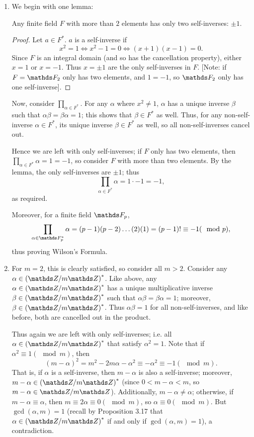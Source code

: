 \documentclass{homework}
\begin{document}
\begin{solution}
  \begin{enumerate}[label=(\alph*)]
    \item We begin with one lemma:
      \begin{lemma}
        Any finite field $F$ with more than $2$ elements has only two self-inverses: $\pm 1$.
      \end{lemma}
      \begin{proof}[Proof]
        Let $a\in F^*$. $a$ is a self-inverse if \[
          x^2=1\iff x^2-1=0\iff (x+1)(x-1)=0
        .\] Since $F$ is an integral domain (and so has the cancellation property), either $x=1$ or
        $x=-1$. Thus $x=\pm 1$ are the only self-inverses in $F$. [Note: if $F=\F_2$ only has two
        elements, and $1=-1$, so $\F_2$ only has one self-inverse].
      \end{proof}
      
      Now, consider $\prod_{\alpha\in F^*}$. For any $\alpha$ where $x^2\neq 1$, $\alpha$ has a
      unique inverse $\beta$ such that $\alpha\beta=\beta\alpha=1$; this shows that $\beta\in F^*$
      as well. Thus, for any non-self-inverse $\alpha\in F^*$, its unique inverse $\beta\in F^*$ as
      well, so all non-self-inverses cancel out.

      Hence we are left with only self-inverses; if $F$ only has two elements, then
      $\prod_{\alpha\in F^*} \alpha=1=-1$, so consider $F$ with more than two elements. By the
      lemma, the only self-inverses are $\pm 1$; thus \[
        \prod_{\alpha\in F^*} \alpha=1\cdot -1=-1 
      ,\] as required. 

      Moreover, for a finite field $\F_p$, \[
        \prod_{\alpha\in \F_p^*} \alpha=(p-1)(p-2)\ldots(2)(1)=(p-1)!\equiv -1(\mod{p})  
      ,\] thus proving Wilson's Formula.

    \item For $m=2$, this is clearly satisfied, so consider all $m>2$. Consider any $\alpha\in
      \left( \Z / m\Z \right)^*$. Like above, any $\alpha\in \left( \Z / m\Z \right)^*$ has a unique
      multiplicative inverse $\beta\in \left( \Z / m\Z \right)^*$ such that
      $\alpha\beta=\beta\alpha=1$; moreover, $\beta\in \left( \Z / m\Z \right)^*$. Thus
      $\alpha\beta=1$ for all non-self-inverses, and like before, both are cancelled out in the
      product.

      Thus again we are left with only self-inverses; i.e. all $\alpha\in \left( \Z / m\Z \right)^*$
      that satisfy $\alpha^2=1$. Note that if $\alpha^2\equiv 1(\mod{m})$, then \[
        (m-\alpha)^2=m^2-2m\alpha-\alpha^2\equiv-\alpha^2\equiv-1(\mod{m})
      .\] That is, if $\alpha$ is a self-inverse, then $m-\alpha$ is also a self-inverse; moreover,
      $m-\alpha\in \left( \Z / m\Z \right)^*$ (since $0<m-\alpha<m$, so $m-\alpha\in \Z / m\Z$).
      Additionally, $m-\alpha\neq \alpha$; otherwise, if $m-\alpha\equiv\alpha$, then $m\equiv
      2\alpha\equiv 0(\mod{m})$, so $\alpha\equiv 0(\mod{m})$. But $\gcd{(\alpha,m)}=1$ (recall by
      Proposition 3.17 that $\alpha\in \left( \Z / m\Z \right)^*$ if and only if
      $\gcd{(\alpha,m)}=1$), a contradiction.


\end{enumerate}
\end{solution}
\end{document}
